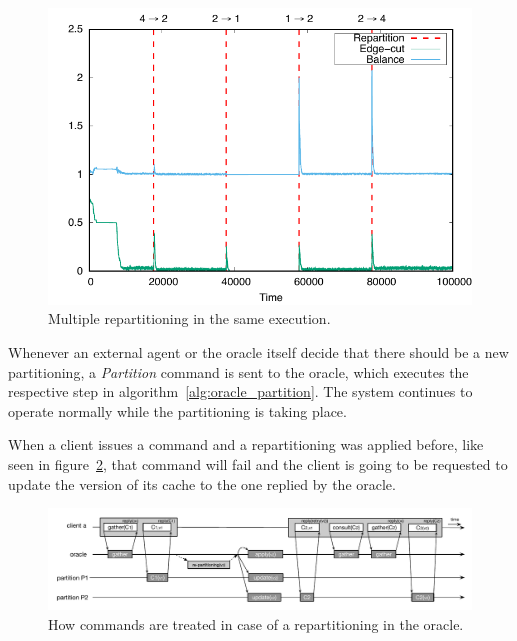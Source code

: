 \begin{figure}
	\includegraphics[width=1.0\linewidth]{graphs/0.01_edgecuts/repartition/4-2-1-2-4/edge_cut_balance_max_4_part}
	\caption{Multiple repartitioning in the same execution.}
	\label{fig:repartition_4_times}
\end{figure}

Whenever an external agent or the oracle itself decide that there should be a new partitioning, a \emph{Partition} command is sent to the oracle, which executes the respective step in algorithm~\ref{alg:oracle_partition}. The system continues to operate normally while the partitioning is taking place.

When a client issues a command and a repartitioning was applied before, like seen in figure~\ref{fig:oracle_repartition}, that command will fail and the client is going to be requested to update the version of its cache to the one replied by the oracle.




\begin{figure}
\begin{minipage}[b]{1\linewidth} %
\centering
      \includegraphics[width=1.0\linewidth]{figures/repartitioning}
\end{minipage}
\caption{How commands are treated in case of a repartitioning in the oracle.}
\label{fig:oracle_repartition}
\end{figure}
